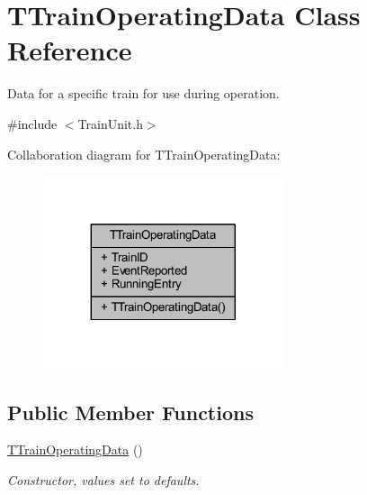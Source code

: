 \hypertarget{class_t_train_operating_data}{}\section{T\+Train\+Operating\+Data Class Reference}
\label{class_t_train_operating_data}


Data for a specific train for use during operation.  




{\ttfamily \#include $<$Train\+Unit.\+h$>$}



Collaboration diagram for T\+Train\+Operating\+Data\+:\nopagebreak
\begin{figure}[H]
\begin{center}
\leavevmode
\includegraphics[width=200pt]{class_t_train_operating_data__coll__graph}
\end{center}
\end{figure}
\subsection*{Public Member Functions}
\begin{DoxyCompactItemize}
\item 
\mbox{\label{class_t_train_operating_data_a0d7961667bbcdf20a744db7c1a2125af}} 
\mbox{\hyperlink{class_t_train_operating_data_a0d7961667bbcdf20a744db7c1a2125af}{T\+Train\+Operating\+Data}} ()
\begin{DoxyCompactList}\small\item\em Constructor, values set to defaults. \end{DoxyCompactList}\end{DoxyCompactItemize}
